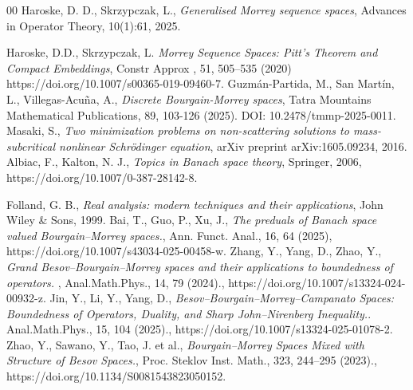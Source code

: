 \documentclass[preprint,12pt]{elsarticle}
\begin{document}
\begin{thebibliography}{00}
  Haroske,  D. D.,  Skrzypczak, L.,
  \textit{Generalised Morrey sequence spaces},
  Advances in Operator Theory,
  10(1):61,
  2025.

 Haroske, D.D., Skrzypczak, L.
  \textit{  Morrey Sequence Spaces: Pitt’s Theorem and Compact Embeddings},
  Constr Approx ,
   51, 505–535 (2020)
  https://doi.org/10.1007/s00365-019-09460-7.
   Guzmán-Partida, M.,  San Martín, L.,  Villegas-Acuña, A.,
  \textit{Discrete Bourgain-Morrey spaces},
  Tatra Mountains Mathematical Publications,
  89, 103-126 (2025).
  DOI: 10.2478/tmmp-2025-0011.
 Masaki, S.,
  \textit{Two minimization problems on non-scattering solutions to mass-subcritical nonlinear Schrödinger equation},
  arXiv preprint arXiv:1605.09234,
  2016.
 Albiac, F., Kalton, N. J.,
  \textit{Topics in Banach space theory},
  Springer,
  2006,
  https://doi.org/10.1007/0-387-28142-8.
  
  Folland, G. B.,
  \textit{ Real analysis: modern techniques and their applications},
John Wiley \& Sons,
  1999.
 Bai, T., Guo, P.,  Xu, J.,
 \textit{ The preduals of Banach space valued Bourgain–Morrey spaces.},
 Ann. Funct. Anal.,
 16, 64 (2025), https://doi.org/10.1007/s43034-025-00458-w.
 Zhang, Y., Yang, D., Zhao, Y.,
 \textit{ Grand Besov–Bourgain–Morrey spaces and their applications to boundedness of operators. },
 Anal.Math.Phys.,
 14, 79 (2024).,
 https://doi.org/10.1007/s13324-024-00932-z.
 Jin, Y., Li, Y.,  Yang, D.,
 \textit{ Besov–Bourgain–Morrey–Campanato Spaces: Boundedness of Operators, Duality, and Sharp John–Nirenberg Inequality.}.
 Anal.Math.Phys.,
 15, 104 (2025).,
 https://doi.org/10.1007/s13324-025-01078-2.
 Zhao, Y., Sawano, Y., Tao, J. et al., \textit{ Bourgain–Morrey Spaces Mixed with Structure of Besov Spaces.},
 Proc. Steklov Inst. Math.,
 323, 244–295 (2023).,
https://doi.org/10.1134/S0081543823050152.
\end{thebibliography}
\end{document}
